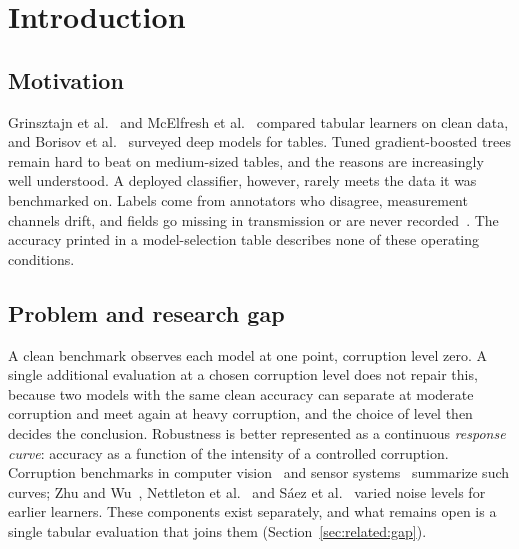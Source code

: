 \documentclass[pdflatex,sn-mathphys]{sn-jnl}
\theoremstyle{thmstyleone}
\theoremstyle{thmstyletwo}
\theoremstyle{thmstylethree}
\begin{document}
\maketitle

\section{Introduction}\label{sec:intro}

\subsection{Motivation}\label{sec:intro:motivation}

Grinsztajn et al.~\cite{grinsztajn2022tree} and McElfresh et al.~\cite{mcelfresh2023when} compared tabular learners on clean data, and Borisov et al.~\cite{borisov2024deep} surveyed deep models for tables. Tuned gradient-boosted trees remain hard to beat on medium-sized tables, and the reasons are increasingly well understood. A deployed classifier, however, rarely meets the data it was benchmarked on. Labels come from annotators who disagree, measurement channels drift, and fields go missing in transmission or are never recorded~\cite{sambasivan2021everyone}. The accuracy printed in a model-selection table describes none of these operating conditions.

\subsection{Problem and research gap}\label{sec:intro:gap}

A clean benchmark observes each model at one point, corruption level zero. A single additional evaluation at a chosen corruption level does not repair this, because two models with the same clean accuracy can separate at moderate corruption and meet again at heavy corruption, and the choice of level then decides the conclusion. Robustness is better represented as a continuous \emph{response curve}: accuracy as a function of the intensity of a controlled corruption. Corruption benchmarks in computer vision~\cite{hendrycks2019benchmarking} and sensor systems~\cite{mena2025multisensor} summarize such curves; Zhu and Wu~\cite{zhu2004class}, Nettleton et al.~\cite{nettleton2010study} and S\'aez et al.~\cite{saez2015evaluating} varied noise levels for earlier learners. These components exist separately, and what remains open is a single tabular evaluation that joins them (Section~\ref{sec:related:gap}).
\end{document}
